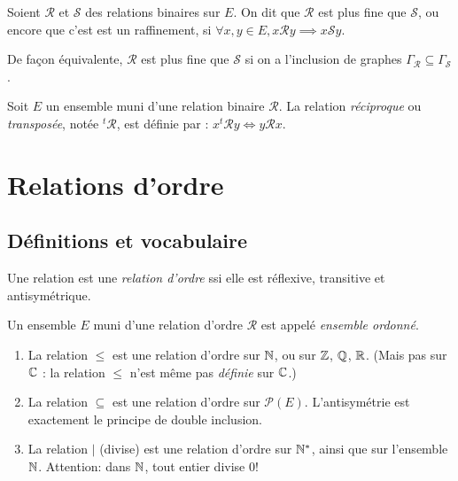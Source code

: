 \begin{definition}
Soient $\mathcal R$ et $\mathcal S$ des relations binaires sur $E$. On dit que $\mathcal R$ est plus fine que $\mathcal S$, ou encore que c'est est un raffinement, si $\forall x, y\in E, x\mathcal R y \implies x\mathcal S y$. 

De façon équivalente, $\mathcal R$ est plus fine que $\mathcal S$ si on a l'inclusion de graphes $\Gamma_{\mathcal R} \subseteq \Gamma_{\mathcal S}$.
\end{definition}



\begin{definition}
Soit $E$ un ensemble muni d'une relation binaire $\mathcal R$. La relation \emph{réciproque} ou \emph{transposée}, notée ${}^t\mathcal R$, est définie par : $x{}^t\mathcal R y \iff y\mathcal R x$. 
\end{definition}



\section{Relations d'ordre}

\subsection{Définitions et vocabulaire}


\begin{definition}
Une relation est une \emph{relation d'ordre} ssi elle est réflexive, transitive et antisymétrique.

Un ensemble $E$ muni d'une relation d'ordre ${\mathcal R}$ est appelé \emph{ensemble ordonné}.
\end{definition}

\begin{exemples}
\begin{enumerate}[label=\alph*)]
\item La relation $\leq$ est une relation d'ordre sur $\mathbb{N}$, ou sur $\mathbb{Z}$, $\mathbb{Q}$, $\mathbb{R}$. (Mais pas sur $\mathbb{C}$ : la relation $\leq$ n'est même pas \emph{définie} sur $\mathbb{C}$.)
\item La relation $\subseteq$ est une relation d'ordre sur $\mathcal P(E)$. L'antisymétrie est exactement le principe de double inclusion.
\item La relation $|$ (\og divise\fg) est une relation d'ordre sur $\mathbb{N}^*$, ainsi que sur l'ensemble $\mathbb{N}$. Attention: dans $\mathbb{N}$, tout entier divise $0$! 
\end{enumerate}
\end{exemples}

